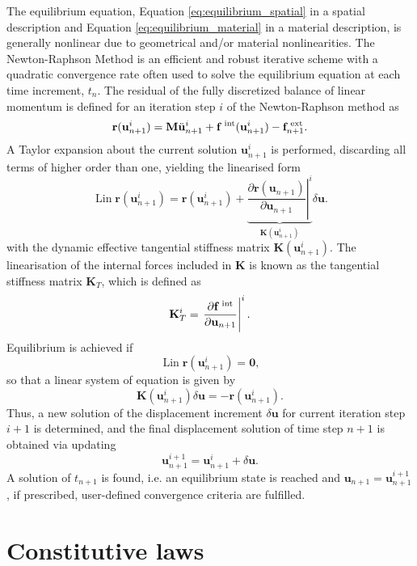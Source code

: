 The equilibrium equation, Equation \eqref{eq:equilibrium_spatial} in a spatial description and Equation \eqref{eq:equilibrium_material} in a material description, is generally nonlinear due to geometrical and/or material nonlinearities.
The Newton-Raphson Method is an efficient and robust iterative scheme with a quadratic convergence rate often used to solve the equilibrium equation at each time increment, $t_n$.
The residual of the fully discretized balance of linear momentum is defined for an iteration step \(i\) of the Newton-Raphson method as
\begin{equation}
\mathbf{r}(\mathbf{u}_{n+1}^{i})=\mathbf{M} \ddot{\mathbf u}_{n+1}^{i}+\mathbf f^\text{\;int} (\mathbf{u}_{n+1}^{i})-\mathbf{f}_{n+1}^\text{\;ext}.
\end{equation}
A Taylor expansion about the current solution \(\mathbf{u}_{n+1}^{i}\) is performed, discarding all terms of  higher order than one, yielding the linearised form
\begin{equation}
\operatorname{Lin} \mathbf{r}(\mathbf{u}_{n+1}^{i})=\mathbf{r}(\mathbf{u}_{n+1}^{i})+\underbrace{\left.\frac{\partial \mathbf{r}(\mathbf{u}_{n+1})}{\partial \mathbf{u}_{n+1} }\right|^{i} }_{\mathbf{K}(\mathbf{u}_{n+1}^{i})} \delta \mathbf{u}.
\end{equation}
with the dynamic effective tangential stiffness matrix \(\mathbf{K}(\mathbf{u}_{n+1}^{i})\).
The linearisation of the internal forces included in \(\mathbf{K}\) is known as the tangential stiffness matrix \(\mathbf{K}_T\), which is defined as
\begin{equation}
\mathbf{K}_{T}^{i}=\left.\frac{\partial \mathbf{f}^{\text{\;int}} }{\partial \mathbf{u}_{n+1}}\right|^{i}.
\end{equation}
Equilibrium is achieved if
\begin{equation}
\operatorname{Lin} \mathbf{r}(\mathbf{u}_{n+1}^{i}) = \mathbf{0},
\end{equation}
so that a linear system of equation is given by
\begin{equation}
\mathbf{K}(\mathbf{u}_{n+1}^{i}) \delta \mathbf{u}=-\mathbf{r}\left(\mathbf{u}_{n+1}^{i}\right).
\end{equation}
Thus, a new solution of the displacement increment \(\delta \mathbf{u}\) for current iteration step \(i+1\) is determined, and the final displacement solution of time step \(n+1\) is obtained via updating
\begin{equation}
\mathbf{u}_{n+1}^{i+1}=\mathbf{u}_{n+1}^{i}+\delta \mathbf{u}.
\end{equation}
A solution of \(t_{n+1}\) is found, i.e. an equilibrium state is reached and \(\mathbf{u}_{n+1}=\mathbf{u}_{n+1}^{i+1}\), if prescribed, user-defined convergence criteria are fulfilled.



\section{Constitutive laws}
